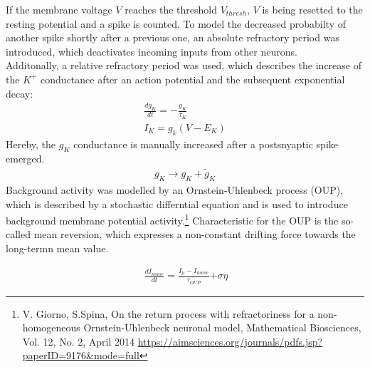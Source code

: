 \documentclass[12pt,a4paper, bibliography=totoc, listof=numbered, footexclude, BCOR=8.25mm, twoside]{scrartcl}
\begin{document}
 
 If the membrane voltage $V$ reaches the threshold  $V_{thresh}$, $V$ is being resetted to the resting potential and a spike is counted. To model the decreased probabilty of another spike shortly after a previous one, an absolute refractory period was introduced, which deactivates incoming inputs from other neurons.\\
 Additonally, a relative refractory period was used, which describes the increase of the $K^+$ conductance after an action potential and the subsequent exponential decay:
  \begin{align}
  \frac{d g_K}{dt}=-\frac{g_K}{\tau_K} \\
  I_K=g_k(V-E_K)
  \end{align}
  Hereby, the $g_K$ conductance is manually increased after a postsnyaptic spike emerged.
  \begin{align}
   	g_K \rightarrow g_K + {\tilde{g}}_K
  \end{align}
  Background activity was modelled by an Ornstein-Uhlenbeck process (OUP), which is described by a stochastic differntial equation and is used to introduce background membrane potential activity.\footnote{V. Giorno, S.Spina, On the return process with refractoriness for a non-homogeneous Ornstein-Uhlenbeck neuronal model, Mathematical Biosciences, Vol. 12, No. 2, April 2014 \url{https://aimsciences.org/journals/pdfs.jsp?paperID=9176&mode=full}} Characteristic for the OUP is the so-called mean reversion, which expresses a non-constant drifting force towards the long-termn mean value.
  

   \begin{align}
   \  \frac{d I_{noise}}{dt}=\frac{{I_\mu}-I_{noise}}{\tau_{OUP}} {+ \sigma \eta}
   \end{align}
   
\end{document}

